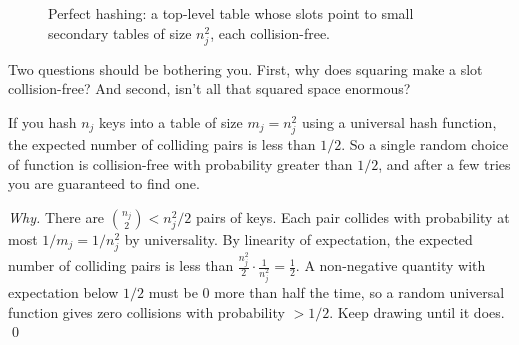\begin{figure}[h]
\centering
{}
\caption{Perfect hashing: a top-level table whose slots point to small secondary tables of size $n_j^2$, each collision-free.}
\label{ch11:perfect-hashing-picture}
\end{figure}

Two questions should be bothering you. First, why does squaring make a slot collision-free? And second, isn't all that squared space enormous?

\begin{lemma}
\label{ch11:perfect-lemma}
If you hash $n_j$ keys into a table of size $m_j = n_j^2$ using a universal hash function, the expected number of colliding pairs is less than $1/2$. So a single random choice of function is collision-free with probability greater than $1/2$, and after a few tries you are guaranteed to find one.
\end{lemma}

\begin{proof}[Why]
There are $\binom{n_j}{2} < n_j^2/2$ pairs of keys. Each pair collides with probability at most $1/m_j = 1/n_j^2$ by universality. By linearity of expectation, the expected number of colliding pairs is less than $\frac{n_j^2}{2}\cdot\frac{1}{n_j^2} = \frac12$. A non-negative quantity with expectation below $1/2$ must be $0$ more than half the time, so a random universal function gives zero collisions with probability $> 1/2$. Keep drawing until it does. \qed
\end{proof}

